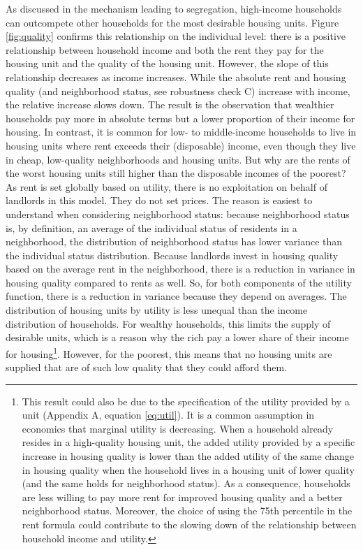 \documentclass[a4paper,12pt]{article}
\begin{document}
As discussed in the mechanism leading to segregation, high-income households can outcompete other households for the most desirable housing units. Figure \ref{fig:quality} confirms this relationship on the individual level: there is a positive relationship between household income and both the rent they pay for the housing unit and the quality of the housing unit. However, the slope of this relationship decreases as income increases. While the absolute rent and housing quality (and neighborhood status, see robustness check C) increase with income, the relative increase slows down. The result is the observation that wealthier households pay more in absolute terms but a lower proportion of their income for housing. In contrast, it is common for low- to middle-income households to live in housing units where rent exceeds their (disposable) income, even though they live in cheap, low-quality neighborhoods and housing units. But why are the rents of the worst housing units still higher than the disposable incomes of the poorest? As rent is set globally based on utility, there is no exploitation on behalf of landlords in this model. They do not set prices. The reason is easiest to understand when considering neighborhood status: because neighborhood status is, by definition, an average of the individual status of residents in a neighborhood, the distribution of neighborhood status has lower variance than the individual status distribution. Because landlords invest in housing quality based on the average rent in the neighborhood, there is a reduction in variance in housing quality compared to rents as well. So, for both components of the utility function, there is a reduction in variance because they depend on averages. The distribution of housing units by utility is less unequal than the income distribution of households. For wealthy households, this limits the supply of desirable units, which is a reason why the rich pay a lower share of their income for housing\footnote{This result could also be due to the specification of the utility provided by a unit (Appendix A, equation \ref{eq:util}). It is a common assumption in economics that marginal utility is decreasing. When a household already resides in a high-quality housing unit, the added utility provided by a specific increase in housing quality is lower than the added utility of the same change in housing quality when the household lives in a housing unit of lower quality (and the same holds for neighborhood status). As a consequence, households are less willing to pay more rent for improved housing quality and a better neighborhood status. Moreover, the choice of using the 75th percentile in the rent formula could contribute to the slowing down of the relationship between household income and utility.}. However, for the poorest, this means that no housing units are supplied that are of such low quality that they could afford them. 
\end{document}
